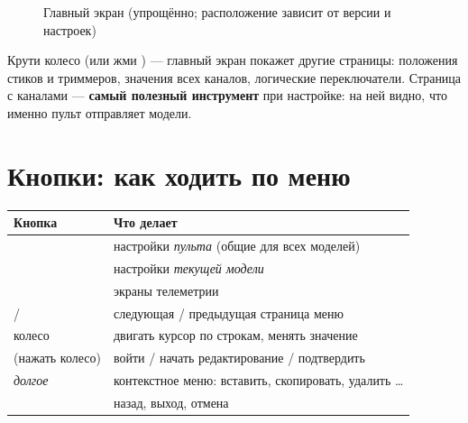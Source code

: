 \begin{figure}[H]
\centering
{}
\caption{Главный экран (упрощённо; расположение зависит от версии и настроек)}
\end{figure}

Крути колесо (или жми ) --- главный экран покажет другие страницы: положения стиков
и триммеров, значения всех каналов, логические переключатели. Страница с каналами ---
\textbf{самый полезный инструмент} при настройке: на ней видно, что именно пульт отправляет
модели.

\section{Кнопки: как ходить по меню}

\begin{center}\small
\renewcommand{\arraystretch}{1.25}
\begin{tabularx}{\linewidth}{@{}L{40mm}Y@{}}
\toprule
\textbf{Кнопка} & \textbf{Что делает} \\
\midrule
{} & настройки \emph{пульта} (общие для всех моделей) \\
 & настройки \emph{текущей модели} \\
 & экраны телеметрии \\
 /  & следующая / предыдущая страница меню \\
колесо & двигать курсор по строкам, менять значение \\
 (нажать колесо) & войти / начать редактирование / подтвердить \\
\emph{долгое}  & контекстное меню: вставить, скопировать, удалить … \\
 & назад, выход, отмена \\
\bottomrule
\end{tabularx}
\end{center}

